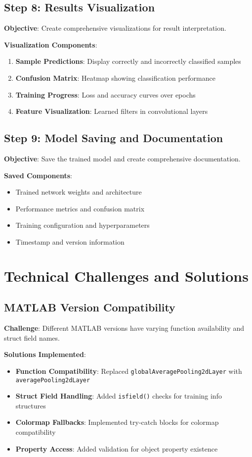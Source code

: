 \documentclass[12pt,a4paper]{article}
\begin{document}
\subsection{Step 8: Results Visualization}

\textbf{Objective}: Create comprehensive visualizations for result interpretation.

\textbf{Visualization Components}:
\begin{enumerate}
    \item \textbf{Sample Predictions}: Display correctly and incorrectly classified samples
    \item \textbf{Confusion Matrix}: Heatmap showing classification performance
    \item \textbf{Training Progress}: Loss and accuracy curves over epochs
    \item \textbf{Feature Visualization}: Learned filters in convolutional layers
\end{enumerate}

\subsection{Step 9: Model Saving and Documentation}

\textbf{Objective}: Save the trained model and create comprehensive documentation.

\textbf{Saved Components}:
\begin{itemize}
    \item Trained network weights and architecture
    \item Performance metrics and confusion matrix
    \item Training configuration and hyperparameters
    \item Timestamp and version information
\end{itemize}

\section{Technical Challenges and Solutions}

\subsection{MATLAB Version Compatibility}

\textbf{Challenge}: Different MATLAB versions have varying function availability and struct field names.

\textbf{Solutions Implemented}:
\begin{itemize}
    \item \textbf{Function Compatibility}: Replaced \texttt{globalAveragePooling2dLayer} with \texttt{averagePooling2dLayer}
    \item \textbf{Struct Field Handling}: Added \texttt{isfield()} checks for training info structures
    \item \textbf{Colormap Fallbacks}: Implemented try-catch blocks for colormap compatibility
    \item \textbf{Property Access}: Added validation for object property existence
\end{itemize}
\end{document}
